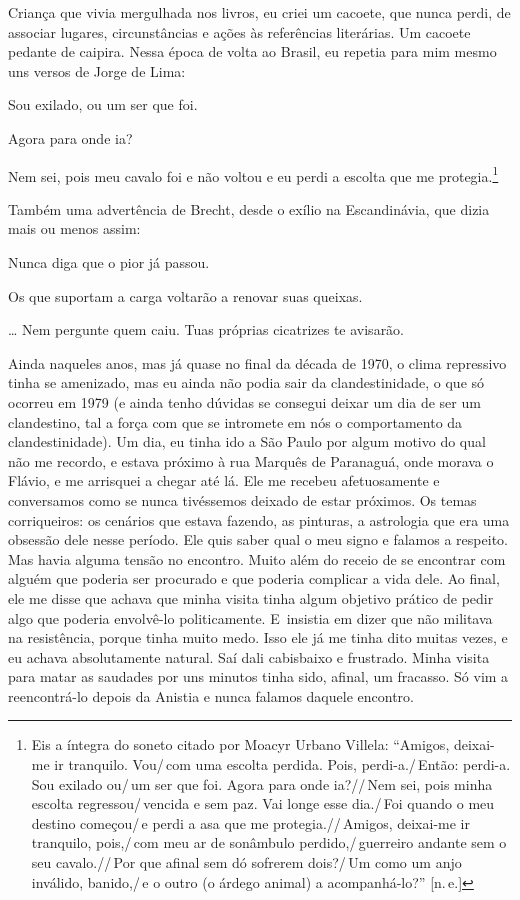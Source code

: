 {Criança que vivia mergulhada nos livros, eu criei um cacoete, que nunca
perdi, de associar lugares, circunstâncias e ações às referências
literárias. Um cacoete pedante de caipira. Nessa época de volta ao
Brasil, eu repetia para mim mesmo uns versos de Jorge de Lima:

\startblockquote
Sou exilado, ou um ser que foi.

Agora para onde ia?

Nem sei, pois meu cavalo foi e não voltou e eu perdi a escolta que me protegia.\footnote{Eis a íntegra do soneto citado por Moacyr Urbano Villela: “Amigos, deixai-me ir tranquilo. Vou/\,com uma escolta perdida. Pois, perdi-a./\,Então: perdi-a. Sou exilado ou/\,um ser que foi. Agora para onde ia?//\,Nem sei, pois minha escolta regressou/\,vencida e sem paz. Vai longe esse dia./\,Foi quando o meu destino começou/\,e perdi a asa que me protegia.//\,Amigos, deixai-me ir tranquilo, pois,/\,com meu ar de sonâmbulo perdido,/\,guerreiro andante sem o seu cavalo.//\,Por que afinal sem dó sofrerem dois?/\,Um como um anjo inválido, banido,/\,e o outro (o árdego animal) a acompanhá-lo?” {[}{\sc n.\,e.}{]}}
\stopblockquote

Também uma advertência de Brecht, desde o exílio na Escandinávia, que
dizia mais ou menos assim:

\startblockquote
Nunca diga que o pior já passou.

Os que suportam a carga voltarão a renovar suas queixas.

\ldots{} Nem pergunte quem caiu. Tuas próprias cicatrizes te avisarão.
\stopblockquote

Ainda naqueles anos, mas já quase no final da década de 1970, o clima
repressivo tinha se amenizado, mas eu ainda não podia sair da
clandestinidade, o que só ocorreu em 1979 (e ainda tenho dúvidas se
consegui deixar um dia de ser um clandestino, tal a força com que se
intromete em nós o comportamento da clandestinidade). Um dia, eu tinha
ido a São Paulo por algum motivo do qual não me recordo, e estava próximo
à rua Marquês de Paranaguá, onde morava o Flávio, e me arrisquei a chegar
até lá. Ele me recebeu afetuosamente e conversamos como se nunca
tivéssemos deixado de estar próximos. Os temas corriqueiros: os
cenários que estava fazendo, as pinturas, a astrologia que era uma
obsessão dele nesse período. Ele quis saber qual o meu signo e falamos a
respeito. Mas havia alguma tensão no encontro. Muito além do receio de
se encontrar com alguém que poderia ser procurado e que poderia
complicar a vida dele. Ao final, ele me disse que achava que minha visita
tinha algum objetivo prático de pedir algo que poderia envolvê-lo
politicamente. E~insistia em dizer que não militava na resistência,
porque tinha muito medo. Isso ele já me tinha dito muitas vezes, e eu
achava absolutamente natural. Saí dali cabisbaixo e frustrado. Minha
visita para matar as saudades por uns minutos tinha sido, afinal, um
fracasso. Só vim a reencontrá-lo depois da Anistia e nunca falamos
daquele encontro.

}

